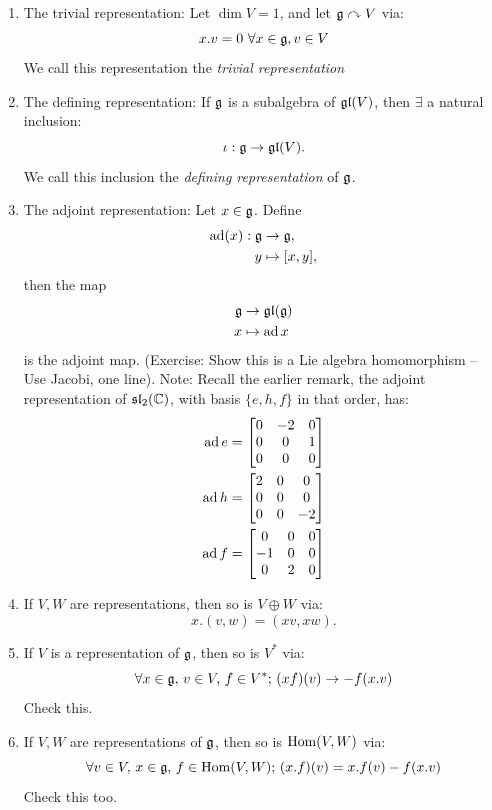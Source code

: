 \documentclass{article}
\begin{document}
\begin{enumerate}
    \item The trivial representation: Let $\dim V = 1$, and let $\mathfrak{g} \curvearrowright V$ via:\[
    x.v=0 \, \, \forall x \in \mathfrak{g}, v \in V \]
    We call this representation the \textit{trivial representation}
    \item The defining representation: If $\mathfrak{g}$ is a subalgebra of $\mathfrak{gl}(V)$, then $\exists$ a natural inclusion: \[
    \iota: \mathfrak{g} \to \mathfrak{gl}(V).
    \] We call this inclusion the \textit{defining representation} of $\mathfrak{g}$.
    \item The adjoint representation: Let $x \in \mathfrak{g}$. Define \begin{align*}
        \operatorname{ad}(x) : \mathfrak{g} &\to \mathfrak{g},\\
        y &\mapsto [x,y],
    \end{align*}
    then the map \begin{align*}
        \mathfrak{g} &\to \mathfrak{gl}(\mathfrak{g})\\
        x &\mapsto \operatorname{ad} x
    \end{align*}
    is the adjoint map. (Exercise: Show this is a Lie algebra homomorphism -- Use Jacobi, one line). \gap
    Note: Recall the earlier remark, the adjoint representation of $\mathfrak{sl}_{2}(\mathbb{C})$, with basis $\{e,h,f\}$ in that order, has:
    \begin{align*}
        \operatorname{ad} e &= \begin{bmatrix}
            0 & -2 & 0\\
            0 & 0 & 1\\
            0 & 0 & 0
        \end{bmatrix}\\
        \operatorname{ad} h &= \begin{bmatrix}
            2 & 0 & 0\\
            0 & 0 & 0\\
            0 & 0 & -2
        \end{bmatrix}\\
        \operatorname{ad} f &= \begin{bmatrix}
            0 & 0 & 0\\
            -1 & 0 & 0\\
            0 & 2 & 0 \\
        \end{bmatrix}
    \end{align*}
    \item If $V,W$ are representations, then so is $V \oplus W$ via: \[ x.(v,w) = (xv,xw). \]
    \item If $V$ is a representation of $\mathfrak{g}$, then so is $V^{*}$ via: \[
    \forall x \in \mathfrak{g}, \, v \in V, \, f \in V^{*}; \, (xf)(v) \to -f(x.v)\]
    Check this.
    \item If $V, W$ are representations of $\mathfrak{g}$, then so is $\operatorname{Hom}(V,W)$ via:
    \[ \forall v \in V, \, x \in \mathfrak{g}, \, f \in \operatorname{Hom}(V,W); \, (x.f)(v) = x.f(v) - f(x.v)\]
    Check this too.
\end{enumerate}
\end{document}
